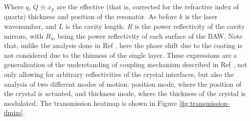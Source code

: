 \documentclass[aps,  
                a4paper, 
                amsmath, 
                amssymb, 
                preprint,
                tightenlines,  
                amsfonts,
                nofootinbib,
                onecolumn,
                titlepage,
                10pt
            ]{revtex4-2}
\begin{document}
    Where $q$, $Q\equiv x_p$ are the effective (that is, corrected for the refractive index of quartz) thickness and position of the resonator. As before $k$ is the laser wavenumber, and $L$ is the cavity length. $R$ is the power reflectivity of the cavity mirrors, with $R_m$ being the power reflectivity of each surface of the BAW. Note that, unlike the analysis done in Ref \cite{li2016}, here the phase shift due to the coating is not considered due to the thinness of the single layer. These expressions are a generalisation of the understanding of coupling mechanism described in Ref \cite{page2021}, not only allowing for arbitrary reflectivities of the crystal interfaces, but also the analysis of two different modes of motion: position mode, where the position of the crystal is actuated, and thickness mode, where the thickness of the crystal is modulated. The transmission heatmap is shown in Figure \ref{fig:transmission-dmim}. 
\end{document}
